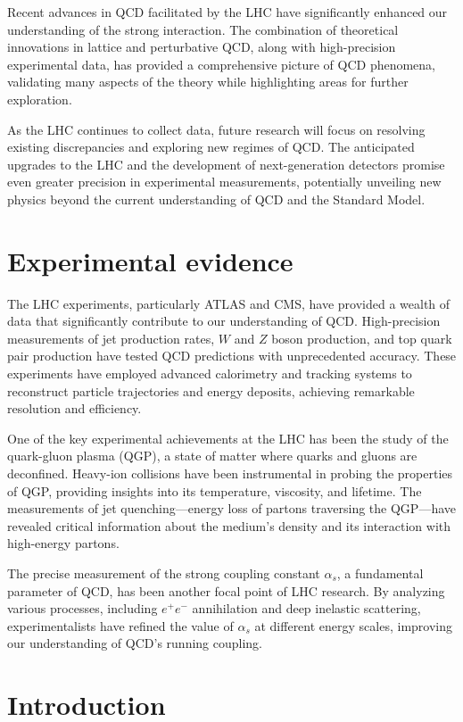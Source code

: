 \documentclass{article}
\begin{document}
Recent advances in QCD facilitated by the LHC have significantly enhanced our understanding of the strong interaction. The combination of theoretical innovations in lattice and perturbative QCD, along with high-precision experimental data, has provided a comprehensive picture of QCD phenomena, validating many aspects of the theory while highlighting areas for further exploration.

As the LHC continues to collect data, future research will focus on resolving existing discrepancies and exploring new regimes of QCD. The anticipated upgrades to the LHC and the development of next-generation detectors promise even greater precision in experimental measurements, potentially unveiling new physics beyond the current understanding of QCD and the Standard Model.

\section{Experimental evidence}

The LHC experiments, particularly ATLAS and CMS, have provided a wealth of data that significantly contribute to our understanding of QCD. High-precision measurements of jet production rates, $W$ and $Z$ boson production, and top quark pair production have tested QCD predictions with unprecedented accuracy. These experiments have employed advanced calorimetry and tracking systems to reconstruct particle trajectories and energy deposits, achieving remarkable resolution and efficiency.

One of the key experimental achievements at the LHC has been the study of the quark-gluon plasma (QGP), a state of matter where quarks and gluons are deconfined. Heavy-ion collisions have been instrumental in probing the properties of QGP, providing insights into its temperature, viscosity, and lifetime. The measurements of jet quenching—energy loss of partons traversing the QGP—have revealed critical information about the medium's density and its interaction with high-energy partons.

The precise measurement of the strong coupling constant $\alpha_s$, a fundamental parameter of QCD, has been another focal point of LHC research. By analyzing various processes, including $e^+e^-$ annihilation and deep inelastic scattering, experimentalists have refined the value of $\alpha_s$ at different energy scales, improving our understanding of QCD's running coupling.

\section{Introduction}
\end{document}
